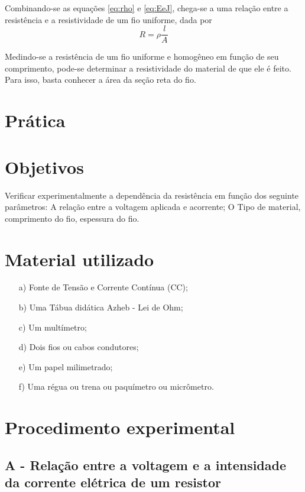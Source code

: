 \noindent 
Combinando-se as equações \ref{eq:rho} e \ref{eq:EeJ}, chega-se a uma relação entre a resistência e a resistividade de um fio uniforme, dada por 
\begin{equation}
    R = \rho \frac{l}{A}
\end{equation}


\noindent Medindo-se a resistência de um fio uniforme e homogêneo em função de seu comprimento, pode-se determinar a resistividade do material de que ele é feito. Para isso, basta conhecer a área da seção reta do fio.


\section*{Prática}
	\section{Objetivos}
	
	Verificar experimentalmente a dependência da resistência em função dos seguinte parâmetros: A relação entre a voltagem aplicada  e acorrente; O Tipo de material, comprimento do fio, espessura do fio. 
	\section{Material utilizado}
	
	\begin{itemize}
		\item[a)] Fonte de Tensão e Corrente Contínua (CC);
		\item[b)] Uma Tábua didática Azheb - Lei de Ohm;
		\item[c)] Um multímetro;
		\item[d)] Dois fios ou cabos condutores;
		\item[e)] Um papel milimetrado;
		\item[f)] Uma régua ou trena ou paquímetro ou micrômetro.
		
	\end{itemize}

	\section{Procedimento experimental}
	
	\subsection{A - Relação entre a voltagem e a intensidade da corrente elétrica de um resistor}

